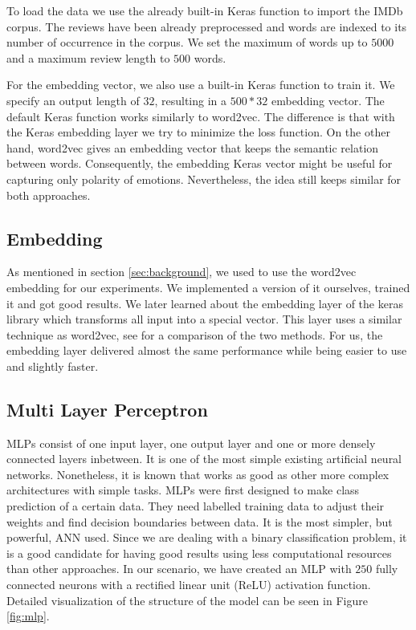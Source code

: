 \documentclass[conference]{IEEEtran}
\theoremstyle{plain}
\theoremstyle{definition}
\theoremstyle{remark}
\begin{document}
To load the data we use the already built-in Keras function to import the IMDb corpus. The reviews have been already preprocessed and words are indexed to its number of occurrence in the corpus. We set the maximum of words up to $5000$ and a maximum review length to $500$ words. 

For the embedding vector, we also use a built-in Keras function to train it. We specify an output length of $32$, resulting in a $500*32$ embedding vector. The default Keras function works similarly to word2vec. The difference is that with the Keras embedding layer we try to minimize the loss function. On the other hand, word2vec gives an embedding vector that keeps the semantic relation between words. Consequently, the embedding Keras vector might be useful for capturing only polarity of emotions. Nevertheless, the idea still keeps similar for both approaches. 
\medskip
\subsection{Embedding}
As mentioned in section \ref{sec:background}, we used to use the word2vec embedding for our experiments. We implemented a version of it ourselves, trained it and got good results. We later learned about the embedding layer \cite{embedding_stackexchange} of the keras library which transforms all input into a special vector. This layer uses a similar technique as word2vec, see \cite{embedding_example} for a comparison of the two methods. For us, the embedding layer delivered almost the same performance while being easier to use and slightly faster.
\medskip
\subsection{Multi Layer Perceptron}
MLPs \cite{perceptron,mlp} consist of one input layer, one output layer and one or more densely connected layers inbetween. It is one of the most simple existing artificial neural networks. Nonetheless, it is known that works as good as other more complex architectures with simple tasks. MLPs were first designed to make class prediction of a certain data. They need labelled training data to adjust their weights and find decision boundaries between data. It is the most simpler, but powerful, ANN used. Since we are dealing with a binary classification problem, it is a good candidate for having good results using less computational resources than other approaches. In our scenario, we have created an MLP with $250$ fully connected neurons with a rectified linear unit (ReLU) activation function. Detailed visualization of the structure of the model can be seen in Figure \ref{fig:mlp}.
\end{document}
